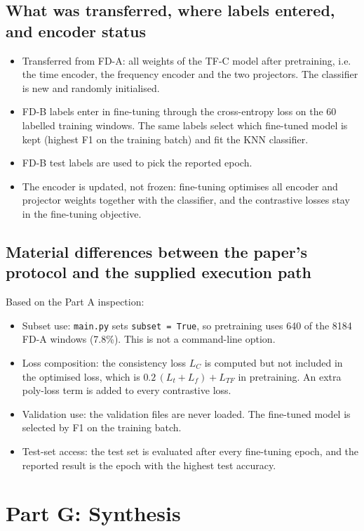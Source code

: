 \documentclass[a4paper,11pt]{article}
\newcommand{\code}[1]{\texttt{#1}}
\begin{document}
\subsection{What was transferred, where labels entered, and encoder status}
\begin{itemize}
    \item Transferred from FD-A: all weights of the TF-C model after pretraining, i.e. the time encoder, the frequency encoder and the two projectors. The classifier is new and randomly initialised.
    \item FD-B labels enter in fine-tuning through the cross-entropy loss on the 60 labelled training windows. The same labels select which fine-tuned model is kept (highest F1 on the training batch) and fit the KNN classifier.
    \item FD-B test labels are used to pick the reported epoch.
    \item The encoder is updated, not frozen: fine-tuning optimises all encoder and projector weights together with the classifier, and the contrastive losses stay in the fine-tuning objective.
\end{itemize}

\subsection{Material differences between the paper's protocol and the supplied execution path}
Based on the Part A inspection:
\begin{itemize}
    \item Subset use: \code{main.py} sets \code{subset = True}, so pretraining uses 640 of the 8184 FD-A windows (7.8\%). This is not a command-line option.
    \item Loss composition: the consistency loss $L_C$ is computed but not included in the optimised loss, which is $0.2\,(L_t + L_f) + L_{TF}$ in pretraining. An extra poly-loss term is added to every contrastive loss.
    \item Validation use: the validation files are never loaded. The fine-tuned model is selected by F1 on the training batch.
    \item Test-set access: the test set is evaluated after every fine-tuning epoch, and the reported result is the epoch with the highest test accuracy.
\end{itemize}

\section{Part G: Synthesis}
\end{document}
